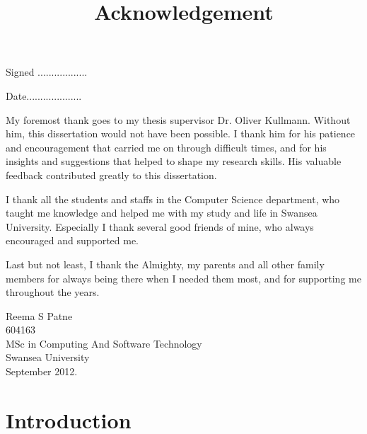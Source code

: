 \documentclass[a4paper,10pt]{report}
\begin{document}
\begin{flushleft}Signed ..................\end{flushleft} 
\begin{flushright}Date....................\end{flushright}                                                                                                                                               \clearpage
\begin{center}
\title {Acknowledgement}
\end{center}
My foremost thank goes to my thesis supervisor Dr. Oliver Kullmann. Without him, this dissertation would not have been possible. I thank him for his patience and encouragement that carried me on through difficult times, and for his insights and suggestions that helped to shape my research skills. His valuable feedback contributed greatly to this dissertation.

I thank all the students and staffs in the Computer Science department, who taught me knowledge and helped me with my study and life in Swansea University. Especially I thank several good friends of mine, who always encouraged and supported me.

 Last but not least, I thank the Almighty, my parents and all other family members for always being there when I needed them most, and for supporting me throughout the years.
\begin{flushright}
Reema S Patne\\
604163\\
MSc in Computing And Software Technology\\
Swansea University\\
September 2012.
\end{flushright}
 
\tableofcontents

\chapter{Introduction}
\label{Intro}
\end{document}
